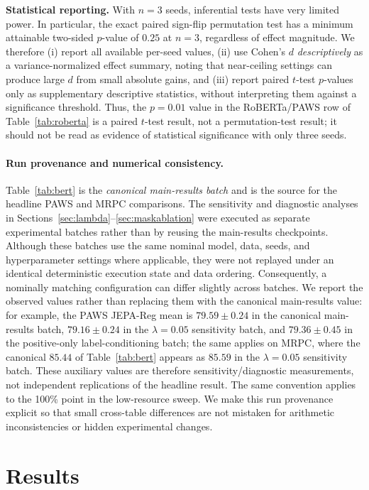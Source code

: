 \documentclass[sigconf]{acmart}
\begin{document}
\textbf{Statistical reporting.} With $n=3$ seeds, inferential tests have very limited power. In particular, the exact paired sign-flip permutation test has a minimum attainable two-sided $p$-value of $0.25$ at $n=3$, regardless of effect magnitude. We therefore (i) report all available per-seed values, (ii) use Cohen's $d$ \emph{descriptively} as a variance-normalized effect summary, noting that near-ceiling settings can produce large $d$ from small absolute gains, and (iii) report paired $t$-test $p$-values only as supplementary descriptive statistics, without interpreting them against a significance threshold. Thus, the $p=0.01$ value in the RoBERTa/PAWS row of Table~\ref{tab:roberta} is a paired $t$-test result, not a permutation-test result; it should not be read as evidence of statistical significance with only three seeds.

\paragraph{Run provenance and numerical consistency.}
Table~\ref{tab:bert} is the \emph{canonical main-results batch} and is the source for the headline PAWS and MRPC comparisons. The sensitivity and diagnostic analyses in Sections~\ref{sec:lambda}--\ref{sec:maskablation} were executed as separate experimental batches rather than by reusing the main-results checkpoints. Although these batches use the same nominal model, data, seeds, and hyperparameter settings where applicable, they were not replayed under an identical deterministic execution state and data ordering. Consequently, a nominally matching configuration can differ slightly across batches. We report the observed values rather than replacing them with the canonical main-results value: for example, the PAWS JEPA-Reg mean is $79.59\pm0.24$ in the canonical main-results batch, $79.16\pm0.24$ in the $\lambda=0.05$ sensitivity batch, and $79.36\pm0.45$ in the positive-only label-conditioning batch; the same applies on MRPC, where the canonical $85.44$ of Table~\ref{tab:bert} appears as $85.59$ in the $\lambda=0.05$ sensitivity batch. These auxiliary values are therefore sensitivity/diagnostic measurements, not independent replications of the headline result. The same convention applies to the 100\% point in the low-resource sweep. We make this run provenance explicit so that small cross-table differences are not mistaken for arithmetic inconsistencies or hidden experimental changes.

\section{Results}
\end{document}

